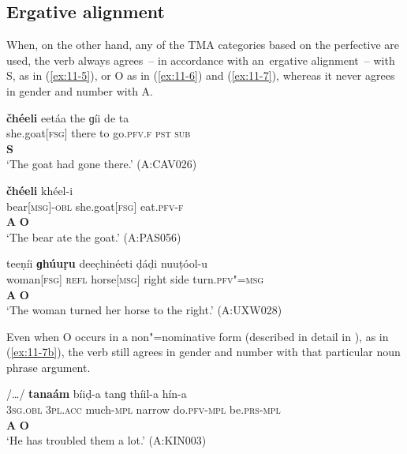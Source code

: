 \subsection{Ergative alignment}
\label{subsec:11-1-2}


When, on the other hand, any of the TMA categories based on the perfective are used, the verb always agrees~-- in accordance with an~ergative alignment~-- with S, as in (\ref{ex:11-5}), or O as in (\ref{ex:11-6}) and (\ref{ex:11-7}), whereas it never agrees in gender and number with A.

\begin{exe}
\ex
\label{ex:11-5}
\glll \textbf{čhéeli} eetáa the ɡíi de ta \\
she.goat[\textsc{fsg}] there to go.\textsc{pfv.}\textsc{f} \textsc{pst} \textsc{sub} \\
 \textbf{S} \\
\glt `The goat had gone there.' (A:CAV026)

\ex
\label{ex:11-6}
\glll [ínc̣-a] \textbf{čhéeli} khéel-i \\
bear[\textsc{msg}]-\textsc{obl} she.goat[\textsc{fsg}] eat.\textsc{pfv-}\textsc{f} \\
\textbf{A} \textbf{O} \\
\glt `The bear ate the goat.' (A:PAS056)

\ex
\label{ex:11-7}
\glll [kúṛi] teeṇíi \textbf{ɡhúuṛu} deec̣hinéeti ḍáḍi nuuṭóol-u \\
woman[\textsc{fsg}] \textsc{refl} horse[\textsc{msg}] right side turn.\textsc{pfv"=msg} \\
\textbf{A} {} \textbf{O} {} {}   \\
\glt `The woman turned her horse to the right.' (A:UXW028)
\end{exe}


Even when O occurs in a non"=nominative form (described in detail in ), as in (\ref{ex:11-7b}), the verb still agrees in gender and number with that particular noun phrase argument.

\begin{exe}
\ex
\label{ex:11-7b}
\glll [tíi] /{\ldots}/ \textbf{tanaám} bíiḍ-a tanɡ thíil-a hín-a \\
\textsc{3sg.obl} {} \textsc{3pl.acc} much-\textsc{mpl} narrow do.\textsc{pfv}-\textsc{mpl} be.\textsc{prs}-\textsc{mpl} \\
\textbf{A} {} \textbf{O} \\
\glt `He has troubled them a lot.' (A:KIN003)
\end{exe}


